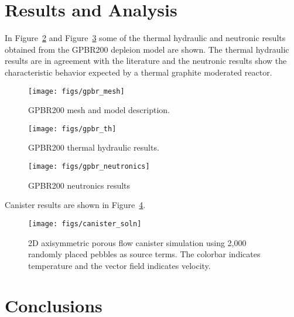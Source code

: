 \documentclass{anstrans}
\begin{document}
\section{Results and Analysis}

In Figure~\ref{fig:gpbr_th} and Figure~\ref{fig:gpbr_neutronics} some of the thermal hydraulic and neutronic results obtained from the GPBR200 depleion model are shown.
The thermal hydraulic results are in agreement with the literature and the neutronic results show the characteristic behavior expected by a thermal graphite moderated reactor.
\begin{figure}[ht] %
  \centering
  \texttt{[image: figs/gpbr\_mesh]}
  \caption{GPBR200 mesh and model description.}
  \label{fig:gpbr_mesh}
\end{figure}
\begin{figure}[ht] %
  \centering
  \texttt{[image: figs/gpbr\_th]}
  \caption{GPBR200 thermal hydraulic results.}
  \label{fig:gpbr_th}
\end{figure}
\begin{figure}[ht] %
  \centering
  \texttt{[image: figs/gpbr\_neutronics]}
  \caption{GPBR200 neutronics results}
  \label{fig:gpbr_neutronics}
\end{figure}

Canister results are shown in Figure~\ref{fig:canister_soln}.
\begin{figure}[ht] %
  \centering
  \texttt{[image: figs/canister\_soln]}
  \caption{2D axisymmetric porous flow canister simulation using 2,000 randomly placed pebbles as source terms.
The colorbar indicates temperature and the vector field indicates velocity.}
  \label{fig:canister_soln}
\end{figure}

\section{Conclusions}
\end{document}
